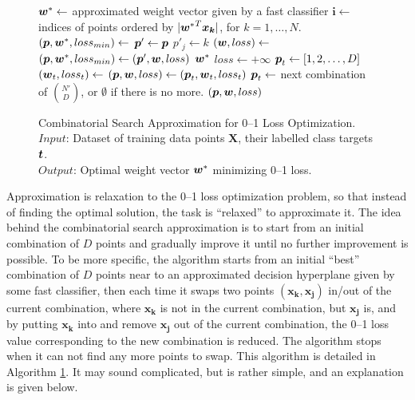 \begin{figure}
\caption{
Combinatorial Search Approximation for 0--1 Loss Optimization. \\
\text{\hspace{2.1cm}} $Input$: Dataset of training data points $ \boldsymbol{X}$, their labelled class targets $\boldsymbol{t}$. \\
\text{\hspace{2.1cm}} $Output$: Optimal weight vector $\boldsymbol{w}^*$ minimizing 0--1 loss.
}
\label{alg:cs.approximation}
\begin{algorithmic}[1]
 
\State $\boldsymbol{w}^* \gets$ approximated weight vector given by a fast classifier
\State $\boldsymbol{i} \gets$ indices of points ordered by $|{\boldsymbol{w}^*}^T\boldsymbol{x_k}|$, for $k=1, \dots, N$.
\State $(\boldsymbol{p}, \boldsymbol{w}^*, loss_{min}) \gets$ 
\Loop
            \State $\boldsymbol{p}' \gets \boldsymbol{p}$
            \State $p'_j \gets k$
            \State $(\boldsymbol{w}, loss) \gets$ 
               \State $(\boldsymbol{p}, \boldsymbol{w}^*, loss_{min}) \gets (\boldsymbol{p}', \boldsymbol{w}, loss)$
            \EndIf
         \EndFor
      \EndIf
   \EndFor
   \State \Return $\boldsymbol{w}^*$
 \EndLoop
\Statex
{} 
   \State $loss \gets +\infty$
   \State $\boldsymbol{p}_t \gets [1,2,\dots,D]$
      \State $(\boldsymbol{w}_t, loss_t) \gets$ 
         \State $(\boldsymbol{p}, \boldsymbol{w}, loss) \gets (\boldsymbol{p}_t, \boldsymbol{w}_t, loss_t)$
      \EndIf
      \State $\boldsymbol{p}_t \gets $ next combination of ${N' \choose D}$, or $\emptyset$ if there is no more.
   \EndWhile
   \State \Return $(\boldsymbol{p}, \boldsymbol{w}, loss)$
\EndFunction
\Statex
\EndFunction
\end{algorithmic}
\end{figure}

Approximation is relaxation to the 0--1 loss optimization problem, so
that instead of finding the optimal solution, the task is ``relaxed''
to approximate it. The idea behind the combinatorial search
approximation is to start from an initial combination of $D$ points
and gradually improve it until no further improvement is possible. To
be more specific, the algorithm starts from an initial ``best''
combination of $D$ points near to an approximated decision hyperplane
given by some fast classifier, then each time it swaps two points
$(\boldsymbol{x_k, x_j})$ in/out of the current combination, where
$\boldsymbol{x_k}$ is not in the current combination, but
$\boldsymbol{x_j}$ is, and by putting $\boldsymbol{x_k}$ into and
remove $\boldsymbol{x_j}$ out of the current combination, the 0--1
loss value corresponding to the new combination is reduced. The
algorithm stops when it can not find any more points to swap. This
algorithm is detailed in Algorithm \ref{alg:cs.approximation}. It may
sound complicated, but is rather simple, and an explanation is given
below.


